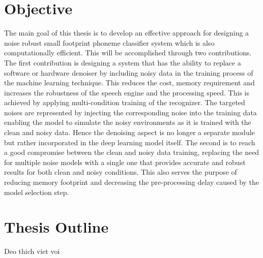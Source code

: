     \section{Objective} \label{sec:intro_objective}
        The main goal of this thesis is to develop an effective approach for designing a noise robust small footprint phoneme classifier system which is also computationally efficient. 
        This will be accomplished through two contributions. 
        The first contribution is designing a system that has the ability to replace a software or hardware denoiser by including noisy data in the training process of the machine learning technique. 
        This reduces the cost, memory requirement and increases the robustness of the speech engine and the processing speed.
        This is achieved by applying multi-condition training of the recognizer. 
        The targeted noises are represented by injecting the corresponding noise into the training data enabling the model to simulate the noisy environments as it is trained with the clean and noisy data.
        Hence the denoising aspect is no longer a separate module but rather incorporated in the deep learning model itself.
        The second is to reach a good compromise between the clean and noisy data training, replacing the need for multiple noise models with a single one that provides accurate and robust results for both clean and noisy conditions. 
        This also serves the purpose of reducing memory footprint and decreasing the pre-processing delay caused by the model selection step.

    \section{Thesis Outline} \label{sec:intro_outline}
        Deo thich viet voi
